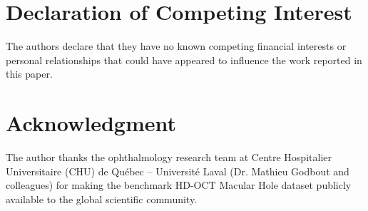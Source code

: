 \documentclass[preprint,12pt]{elsarticle}
\begin{document}
\section*{Declaration of Competing Interest}
The authors declare that they have no known competing financial interests or personal relationships that could have appeared to influence the work reported in this paper.

\section*{Acknowledgment}
The author thanks the ophthalmology research team at Centre Hospitalier Universitaire (CHU) de Qu\'{e}bec – Universit\'{e} Laval (Dr. Mathieu Godbout and colleagues) for making the benchmark HD-OCT Macular Hole dataset publicly available to the global scientific community.
\end{document}
